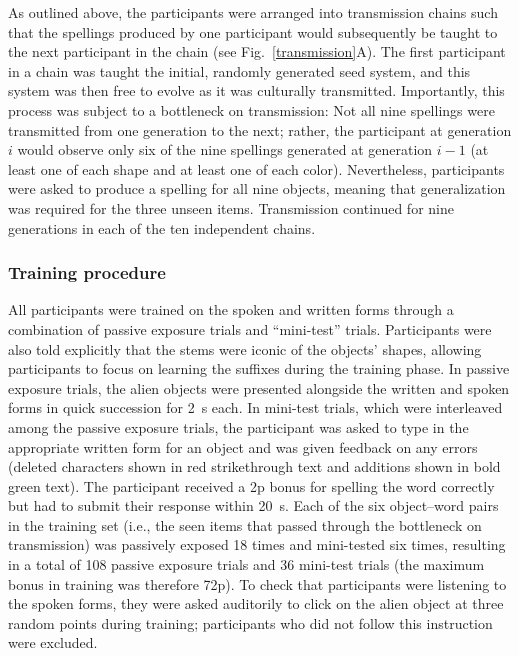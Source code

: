 \documentclass[doc,biblatex]{apa7}
\begin{document}
As outlined above, the participants were arranged into transmission chains such that the spellings produced by one participant would subsequently be taught to the next participant in the chain (see Fig.~\ref{transmission}A). The first participant in a chain was taught the initial, randomly generated seed system, and this system was then free to evolve as it was culturally transmitted. Importantly, this process was subject to a bottleneck on transmission: Not all nine spellings were transmitted from one generation to the next; rather, the participant at generation $i$ would observe only six of the nine spellings generated at generation $i-1$ (at least one of each shape and at least one of each color). Nevertheless, participants were asked to produce a spelling for all nine objects, meaning that generalization was required for the three unseen items. Transmission continued for nine generations in each of the ten independent chains.

\subsubsection{Training procedure}

All participants were trained on the spoken and written forms through a combination of passive exposure trials and ``mini-test'' trials. Participants were also told explicitly that the stems were iconic of the objects' shapes, allowing participants to focus on learning the suffixes during the training phase. In passive exposure trials, the alien objects were presented alongside the written and spoken forms in quick succession for 2~s each. In mini-test trials, which were interleaved among the passive exposure trials, the participant was asked to type in the appropriate written form for an object and was given feedback on any errors (deleted characters shown in red strikethrough text and additions shown in bold green text). The participant received a 2p bonus for spelling the word correctly but had to submit their response within 20~s. Each of the six object--word pairs in the training set (i.e., the seen items that passed through the bottleneck on transmission) was passively exposed 18 times and mini-tested six times, resulting in a total of 108 passive exposure trials and 36 mini-test trials (the maximum bonus in training was therefore 72p). To check that participants were listening to the spoken forms, they were asked auditorily to click on the alien object at three random points during training; participants who did not follow this instruction were excluded.
\end{document}
